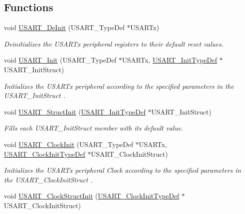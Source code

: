 \subsection*{Functions}
\begin{DoxyCompactItemize}
\item 
void \hyperlink{group___u_s_a_r_t_ga2f8e1ce72da21b6539d8e1f299ec3b0d}{U\-S\-A\-R\-T\-\_\-\-De\-Init} (U\-S\-A\-R\-T\-\_\-\-Type\-Def $\ast$U\-S\-A\-R\-Tx)
\begin{DoxyCompactList}\small\item\em Deinitializes the U\-S\-A\-R\-Tx peripheral registers to their default reset values. \end{DoxyCompactList}\item 
void \hyperlink{group___u_s_a_r_t_ga98da340ea0324002ba1b4263e91ab2ff}{U\-S\-A\-R\-T\-\_\-\-Init} (U\-S\-A\-R\-T\-\_\-\-Type\-Def $\ast$U\-S\-A\-R\-Tx, \hyperlink{struct_u_s_a_r_t___init_type_def}{U\-S\-A\-R\-T\-\_\-\-Init\-Type\-Def} $\ast$U\-S\-A\-R\-T\-\_\-\-Init\-Struct)
\begin{DoxyCompactList}\small\item\em Initializes the U\-S\-A\-R\-Tx peripheral according to the specified parameters in the U\-S\-A\-R\-T\-\_\-\-Init\-Struct . \end{DoxyCompactList}\item 
void \hyperlink{group___u_s_a_r_t_ga34e1faa2f312496c16cfd05155f4c8b1}{U\-S\-A\-R\-T\-\_\-\-Struct\-Init} (\hyperlink{struct_u_s_a_r_t___init_type_def}{U\-S\-A\-R\-T\-\_\-\-Init\-Type\-Def} $\ast$U\-S\-A\-R\-T\-\_\-\-Init\-Struct)
\begin{DoxyCompactList}\small\item\em Fills each U\-S\-A\-R\-T\-\_\-\-Init\-Struct member with its default value. \end{DoxyCompactList}\item 
void \hyperlink{group___u_s_a_r_t_gadb50c7a2175c91acd3728f8eefd0c63d}{U\-S\-A\-R\-T\-\_\-\-Clock\-Init} (U\-S\-A\-R\-T\-\_\-\-Type\-Def $\ast$U\-S\-A\-R\-Tx, \hyperlink{struct_u_s_a_r_t___clock_init_type_def}{U\-S\-A\-R\-T\-\_\-\-Clock\-Init\-Type\-Def} $\ast$U\-S\-A\-R\-T\-\_\-\-Clock\-Init\-Struct)
\begin{DoxyCompactList}\small\item\em Initializes the U\-S\-A\-R\-Tx peripheral Clock according to the specified parameters in the U\-S\-A\-R\-T\-\_\-\-Clock\-Init\-Struct . \end{DoxyCompactList}\item 
void \hyperlink{group___u_s_a_r_t_ga59df27d0adda18b16ee28d47672cc724}{U\-S\-A\-R\-T\-\_\-\-Clock\-Struct\-Init} (\hyperlink{struct_u_s_a_r_t___clock_init_type_def}{U\-S\-A\-R\-T\-\_\-\-Clock\-Init\-Type\-Def} $\ast$U\-S\-A\-R\-T\-\_\-\-Clock\-Init\-Struct)

\end{DoxyCompactItemize}
